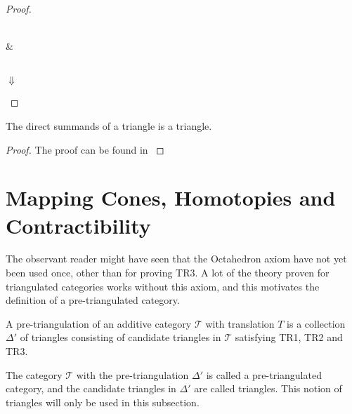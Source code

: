 \begin{proof}
        \begin{center}
             \\
            \& \\
             \\
            $\Downarrow$ \\
        \end{center}
    \end{proof}

    \begin{lemma}
        The direct summands of a triangle is a triangle.
    \end{lemma}

    \begin{proof}
        The proof can be found in \cite{neeman}
    \end{proof}
    

\section{Mapping Cones, Homotopies and Contractibility}

    The observant reader might have seen that the Octahedron axiom have not yet been used once, other than for proving TR3. A lot of the theory proven for triangulated categories works without this axiom, and this motivates the definition of a pre-triangulated category.

    \begin{definition}
        A pre-triangulation of an additive category $\mathcal{T}$ with translation $T$ is a collection $\Delta '$ of triangles consisting of candidate triangles in $\mathcal{T}$ satisfying TR1, TR2 and TR3.

        The category $\mathcal{T}$ with the pre-triangulation $\Delta '$ is called a pre-triangulated category, and the candidate triangles in $\Delta '$ are called  triangles. This notion of triangles will only be used in this subsection.
    \end{definition}

